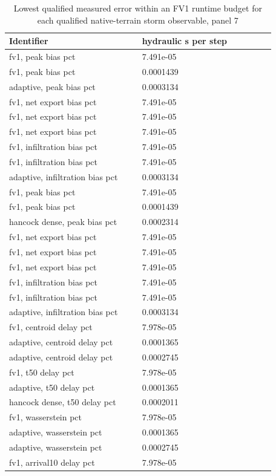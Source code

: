 \begin{longtable}{p{0.4400\linewidth}p{0.4400\linewidth}}
\caption{Lowest qualified measured error within an FV1 runtime budget for each qualified native-terrain storm observable, panel 7}\\
\hline
Identifier & hydraulic s per step \\
\hline\endhead
fv1, peak bias pct & 7.491e-05 \\
fv1, peak bias pct & 0.0001439 \\
adaptive, peak bias pct & 0.0003134 \\
fv1, net export bias pct & 7.491e-05 \\
fv1, net export bias pct & 7.491e-05 \\
fv1, net export bias pct & 7.491e-05 \\
fv1, infiltration bias pct & 7.491e-05 \\
fv1, infiltration bias pct & 7.491e-05 \\
adaptive, infiltration bias pct & 0.0003134 \\
fv1, peak bias pct & 7.491e-05 \\
fv1, peak bias pct & 0.0001439 \\
hancock dense, peak bias pct & 0.0002314 \\
fv1, net export bias pct & 7.491e-05 \\
fv1, net export bias pct & 7.491e-05 \\
fv1, net export bias pct & 7.491e-05 \\
fv1, infiltration bias pct & 7.491e-05 \\
fv1, infiltration bias pct & 7.491e-05 \\
adaptive, infiltration bias pct & 0.0003134 \\
fv1, centroid delay pct & 7.978e-05 \\
adaptive, centroid delay pct & 0.0001365 \\
adaptive, centroid delay pct & 0.0002745 \\
fv1, t50 delay pct & 7.978e-05 \\
adaptive, t50 delay pct & 0.0001365 \\
hancock dense, t50 delay pct & 0.0002011 \\
fv1, wasserstein pct & 7.978e-05 \\
adaptive, wasserstein pct & 0.0001365 \\
adaptive, wasserstein pct & 0.0002745 \\
fv1, arrival10 delay pct & 7.978e-05 \\

\end{longtable}
